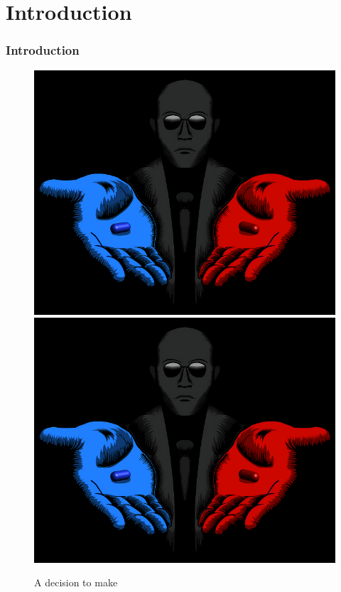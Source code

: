 \section*{Introduction}
\begin{frame}[fragile]
    \frametitle{Introduction}
    \begin{figure}
        \begin{center}
            {
                \includegraphics[height=0.70\textheight,keepaspectratio]{./images/Decision.jpg}
            }
            {
                \includegraphics[height=0.67\textheight,keepaspectratio]{./images/Decision.jpg}
            }
            \caption{A decision to make\footnotemark}
        \end{center}
    \end{figure}

\end{frame}

